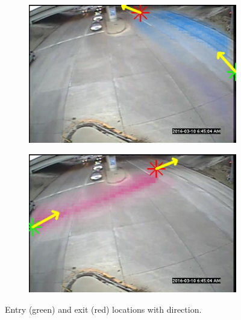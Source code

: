 \begin{figure}
\begin{subfigure}{0.32\linewidth}
        \end{subfigure}
        \begin{subfigure}{0.32\linewidth}
            \includegraphics[width=\linewidth]{./img/scene_learning/res/middle/middle-2.jpg}
        \end{subfigure}
        \begin{subfigure}{0.32\linewidth}
            \includegraphics[width=\linewidth]{./img/scene_learning/res/middle/middle-4.jpg}
        \end{subfigure}
        \caption{Entry (green) and exit (red) locations with direction.}
        \label{fig:entry-exit-full-2}
\end{figure}

